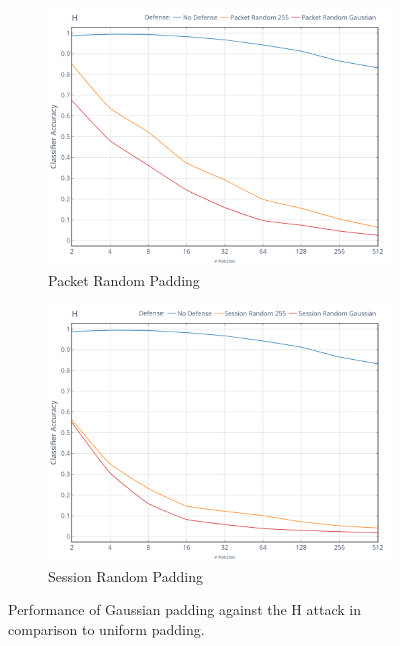 \documentclass[
	ruledheaders=chapter,
	class=report,
	thesis={type=master, department=inf},
	accentcolor=1c,
	custommargins=true,
	marginpar=false,
	parskip=half-,
	fontsize=11pt,
]{tudapub}
\begin{document}
	\begin{figure}
		\begin{subfigure}{0.495\textwidth}
			\centering
			\includegraphics[width=\textwidth]{plots/performance_h_pkt.png}
			\caption{Packet Random Padding}
		\end{subfigure}
		\hfill
		\begin{subfigure}{0.495\textwidth}
			\centering
			\includegraphics[width=\textwidth]{plots/performance_h_ses.png}
			\caption{Session Random Padding}
		\end{subfigure}
		\caption[Performance of Gaussian padding against the H attack]{Performance of Gaussian padding against the H attack \cite{Herrmann2009} in comparison to uniform padding.}
		\label{fig:h}
	\end{figure}
\end{document}
